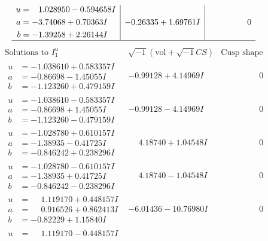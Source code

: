 \documentclass[1p]{elsarticle_modified}
\theoremstyle{definition}
\newcommand{\I}{\sqrt{-1}}
\begin{document}
$$\begin{array}{c|c|c}
\begin{aligned}
u &= \phantom{-}1.028950 - 0.594658 I \\
a &= -3.74068 + 0.70363 I \\
b &= -1.39258 + 2.26144 I\end{aligned}
 & -0.26335 + 1.69761 I & \phantom{-0.000000 } 0\\
 \hline 
 \end{array}$$\newpage$$\begin{array}{c|c|c}  
\text{Solutions to }I^u_{1}& \I (\text{vol} + \sqrt{-1}CS) & \text{Cusp shape}\\
 \hline 
\begin{aligned}
u &= -1.038610 + 0.583357 I \\
a &= -0.86698 - 1.45055 I \\
b &= -1.123260 + 0.479159 I\end{aligned}
 & -0.99128 + 4.14969 I & \phantom{-0.000000 } 0 \\ \hline\begin{aligned}
u &= -1.038610 - 0.583357 I \\
a &= -0.86698 + 1.45055 I \\
b &= -1.123260 - 0.479159 I\end{aligned}
 & -0.99128 - 4.14969 I & \phantom{-0.000000 } 0 \\ \hline\begin{aligned}
u &= -1.028780 + 0.610157 I \\
a &= -1.38935 - 0.41725 I \\
b &= -0.846242 + 0.238296 I\end{aligned}
 & \phantom{-}4.18740 + 1.04548 I & \phantom{-0.000000 } 0 \\ \hline\begin{aligned}
u &= -1.028780 - 0.610157 I \\
a &= -1.38935 + 0.41725 I \\
b &= -0.846242 - 0.238296 I\end{aligned}
 & \phantom{-}4.18740 - 1.04548 I & \phantom{-0.000000 } 0 \\ \hline\begin{aligned}
u &= \phantom{-}1.119170 + 0.448157 I \\
a &= \phantom{-}0.916526 + 0.862413 I \\
b &= -0.82229 + 1.15840 I\end{aligned}
 & -6.01436 - 10.76980 I & \phantom{-0.000000 } 0 \\ \hline\begin{aligned}
u &= \phantom{-}1.119170 - 0.448157 I \\

\end{aligned}
\end{array}$$
\end{document}
